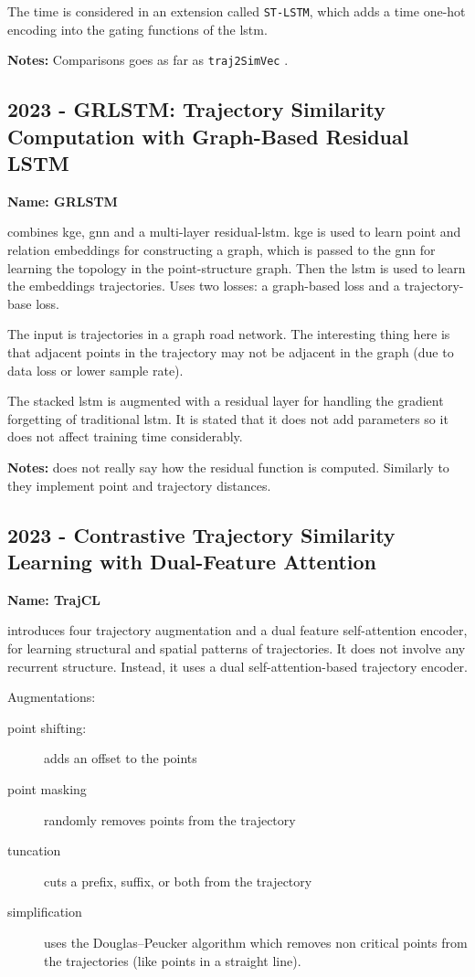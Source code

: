 The time is considered in an extension called \texttt{ST-LSTM}, which adds a time one-hot encoding into the gating functions of the \gls{lstm}.

\textbf{Notes:} Comparisons goes as far as \texttt{traj2SimVec} \cite{zhang2020trajectory}.

\subsection*{2023 - GRLSTM: Trajectory Similarity Computation with Graph-Based Residual LSTM}

\textbf{Name: GRLSTM}

\cite{zhou2023grlstm} combines \gls{kge}, \gls{gnn} and a multi-layer residual-\gls{lstm}.
%
\gls{kge} is used to learn point and relation embeddings for constructing a graph, which is passed to the \gls{gnn} for learning the topology in the point-structure graph. Then the \gls{lstm} is used to learn the embeddings trajectories.
%
Uses two losses: a graph-based loss and a trajectory-base loss.

The input is trajectories in a graph road network. The interesting thing here is that adjacent points in the trajectory may not be adjacent in the graph (due to data loss or lower sample rate).

The stacked \gls{lstm} is augmented with a residual layer for handling the gradient forgetting of traditional \gls{lstm}. It is stated that it does not add parameters so it does not affect training time considerably.

\textbf{Notes:} does not really say how the residual function is computed. Similarly to \cite{han2021graph} they implement point and trajectory distances. 

\subsection*{2023 - Contrastive Trajectory Similarity Learning with Dual-Feature Attention}

\textbf{Name: TrajCL}

\cite{chang2023contrastive} introduces four trajectory augmentation and a dual feature self-attention encoder, for learning structural and spatial patterns of trajectories. It does not involve any recurrent structure. Instead, it uses a dual self-attention-based trajectory encoder.

Augmentations:
\begin{description}
	\item[point shifting:] adds an offset to the points
	\item[point masking] randomly removes points from the trajectory
	\item[tuncation] cuts a prefix, suffix, or both from the trajectory
	\item[simplification] uses the Douglas–Peucker algorithm which removes non critical points from the trajectories (like points in a straight line).
\end{description}

